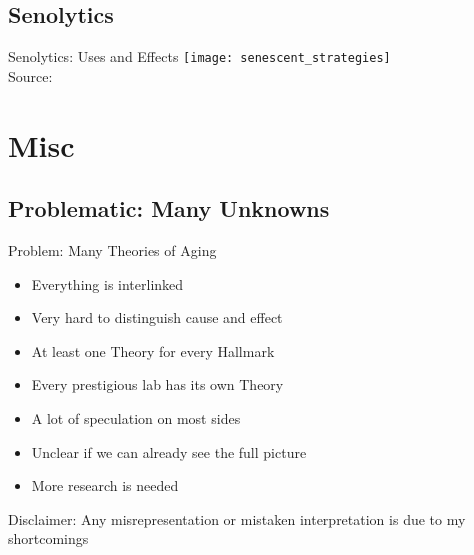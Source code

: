 \subsection{Senolytics}

\begin{frame}[c]{Senolytics: Uses and Effects}
    \scriptsize
    \texttt{[image: senescent\_strategies]} \\
    Source: \cite{paez2019targeting}
\end{frame}



\section{Misc}

\subsection{Problematic: Many Unknowns}

\begin{frame}[c]{Problem: Many Theories of Aging}
    \large
    \begin{itemize}[<+(1)->]
        \item Everything is interlinked
        \item Very hard to distinguish cause and effect
        \item At least one Theory for every Hallmark
        \item Every prestigious lab has its own Theory
        \item A lot of speculation on most sides
        \item Unclear if we can already see the full picture
        \item More research is needed
    \end{itemize}
\end{frame}

\addtocounter{framenumber}{1}
\begin{frame}[standout]
    Disclaimer: Any misrepresentation or mistaken interpretation is due to my shortcomings
\end{frame}
